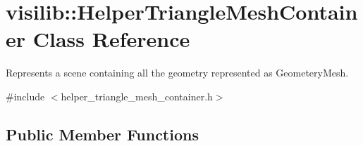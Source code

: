 \hypertarget{classvisilib_1_1_helper_triangle_mesh_container}{}\section{visilib\+::Helper\+Triangle\+Mesh\+Container Class Reference}
\label{classvisilib_1_1_helper_triangle_mesh_container}


Represents a scene containing all the geometry represented as Geometery\+Mesh. 




{\ttfamily \#include $<$helper\+\_\+triangle\+\_\+mesh\+\_\+container.\+h$>$}

\subsection*{Public Member Functions}
